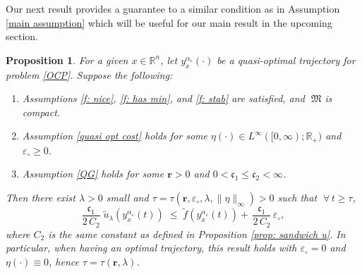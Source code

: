 \documentclass[12pt]{amsart}
\numberwithin{equation}{section}
\theoremstyle{plain}
\newtheorem{proposition}[theorem]{Proposition}
\begin{document}
Our next result provides a guarantee to a similar condition as in Assumption \ref{main assumption} which will be useful for our main result in the upcoming section. 

\begin{proposition}\label{prop: for main assumption}
For a given $x\in\mathbb{R}^{n}$, let $y_{x}^{\alpha_{\varepsilon}}(\cdot)$ be a quasi-optimal trajectory for problem \eqref{OCP}. 
Suppose the following: 
\begin{enumerate}[label = -]
    \item Assumptions \ref{f: nice}, \ref{f: has min}, and \ref{f: stab} are satisfied, and $\;\mathfrak{M}$ is compact.
    \item Assumption \ref{quasi opt cost} holds for some $\eta(\cdot)\in L^{\infty}([0,\infty);\mathbb{R}_{+})$ and $\varepsilon_{\circ}\geq 0$.
    \item Assumption \ref{QG} holds for some $\mathbf{r}>0$ and $0<\mathfrak{c}_{1}\leq \mathfrak{c}_{2}<\infty$.
\end{enumerate}
Then there exist $\lambda>0$ small and $\tau = \tau(\mathbf{r},\varepsilon_{\circ}, \lambda,\|\eta\|_{\infty})>0$ such that $\;\forall\,t\geq\tau$,
\begin{equation*}
    \frac{\mathfrak{c}_{1}}{2\,C_{2}} \;\tilde{u}_{\lambda}(y_{x}^{\alpha_{\varepsilon}}(t)) \; \leq \; \tilde{f}(y_{x}^{\alpha_{\varepsilon}}(t))  + \,\frac{\mathfrak{c}_{1}}{2\,C_{2}}\,\varepsilon_{\circ},
\end{equation*}
where $C_{2}$ is the same constant as defined in Proposition \ref{prop: sandwich u}.  
In particular, when having an optimal trajectory, this result  holds with $\varepsilon_{\circ}=0$ and $\eta(\cdot)\equiv 0$, hence $\tau = \tau(\mathbf{r}, \lambda)$.
\end{proposition}
\end{document}
